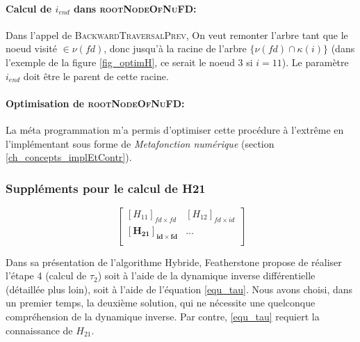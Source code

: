\documentclass{report}
\begin{document}
\paragraph{Calcul de $i_{end}$ dans \textsc{rootNodeOfNuFD}:}
Dans l'appel de \textsc{BackwardTraversalPrev}, On veut remonter l'arbre tant que le noeud visité $\in \nu(fd)$, donc jusqu'à la racine de l'arbre $\{\nu(fd) \cap \kappa(i)\}$ (dans l'exemple de la figure \ref{fig_optimH}, ce serait le noeud $3$ si $i=11$). Le paramètre $i_{end}$ doit être le parent de cette racine.


\paragraph{Optimisation de \textsc{rootNodeOfNuFD}:}
La méta programmation m'a permis d'optimiser cette procédure à l'extrême en l'implémentant sous forme de \emph{Metafonction numérique} (section \ref{ch_concepts_implEtContr}).


\subsubsection{Suppléments pour le calcul de H21}

\setlength{\intextsep}{2pt}
\begin{figure}
  \begin{minipage}[t]{0.35\textwidth}
  \begin{spacing}{1.5}
  \begin{equation*}
  \begin{bmatrix}
    \left[H_{11}\right]_{fd \times fd} & \left[H_{12}\right]_{fd \times id} \\
    \mathbf{\left[H_{21}\right]_{id \times fd}} & \ldots \\
  \end{bmatrix}
  \end{equation*}
  \end{spacing}
  \end{minipage}
\end{figure}

Dans sa présentation de l'algorithme Hybride, Featherstone propose de réaliser l'étape 4 (calcul de $\tau_2$) soit à l'aide de la dynamique inverse différentielle (détaillée plus loin), soit à l'aide de l'équation \eqref{equ_tau}. Nous avons choisi, dans un premier temps, la deuxième solution, qui ne nécessite une quelconque compréhension de la dynamique inverse. Par contre, \eqref{equ_tau} requiert la connaissance de $H_{21}$.
\end{document}

